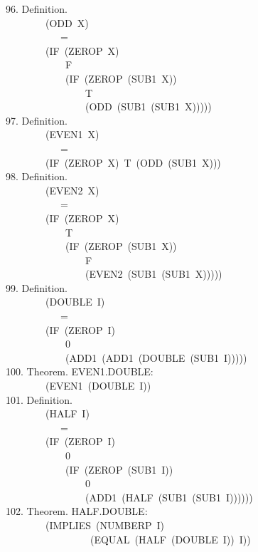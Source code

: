 \documentclass[10pt]{book}
\newenvironment{pubasis}{\begin{flushleft}}{\end{flushleft}}
\begin{document}
\begin{pubasis}
96.     Definition.\\
~~~~~~~~(ODD~X)\\
~~~~~~~~~~~=\\
~~~~~~~~(IF~(ZEROP~X)\\
~~~~~~~~~~~~F\\
~~~~~~~~~~~~(IF~(ZEROP~(SUB1~X))\\
~~~~~~~~~~~~~~~~T\\
~~~~~~~~~~~~~~~~(ODD~(SUB1~(SUB1~X)))))\\

97.     Definition.\\
~~~~~~~~(EVEN1~X)\\
~~~~~~~~~~~=\\
~~~~~~~~(IF~(ZEROP~X)~T~(ODD~(SUB1~X)))\\

98.     Definition.\\
~~~~~~~~(EVEN2~X)\\
~~~~~~~~~~~=\\
~~~~~~~~(IF~(ZEROP~X)\\
~~~~~~~~~~~~T\\
~~~~~~~~~~~~(IF~(ZEROP~(SUB1~X))\\
~~~~~~~~~~~~~~~~F\\
~~~~~~~~~~~~~~~~(EVEN2~(SUB1~(SUB1~X)))))\\

99.     Definition.\\
~~~~~~~~(DOUBLE~I)\\
~~~~~~~~~~~=\\
~~~~~~~~(IF~(ZEROP~I)\\
~~~~~~~~~~~~0\\
~~~~~~~~~~~~(ADD1~(ADD1~(DOUBLE~(SUB1~I)))))\\

100.    Theorem.  EVEN1.DOUBLE:\\
~~~~~~~~(EVEN1~(DOUBLE~I))\\

101.    Definition.\\
~~~~~~~~(HALF~I)\\
~~~~~~~~~~~=\\
~~~~~~~~(IF~(ZEROP~I)\\
~~~~~~~~~~~~0\\
~~~~~~~~~~~~(IF~(ZEROP~(SUB1~I))\\
~~~~~~~~~~~~~~~~0\\
~~~~~~~~~~~~~~~~(ADD1~(HALF~(SUB1~(SUB1~I))))))\\

102.    Theorem.  HALF.DOUBLE:\\
~~~~~~~~(IMPLIES~(NUMBERP~I)\\
~~~~~~~~~~~~~~~~~(EQUAL~(HALF~(DOUBLE~I))~I))\\


\end{pubasis}
\end{document}
